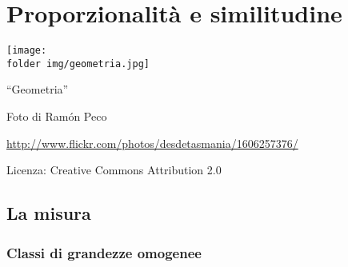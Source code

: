 
\chapter{Proporzionalità e similitudine}

\texttt{[image: \\folder img/geometria.jpg]}
  \begin{center}
    {\large ``Geometria''}\par
    Foto di Ram\'on Peco\par
    \url{http://www.flickr.com/photos/desdetasmania/1606257376/}\par
    Licenza: Creative Commons Attribution 2.0\par
  \end{center}
\newpage


\section{La misura}\label{sect:misura2}

\subsection{Classi di grandezze omogenee}

